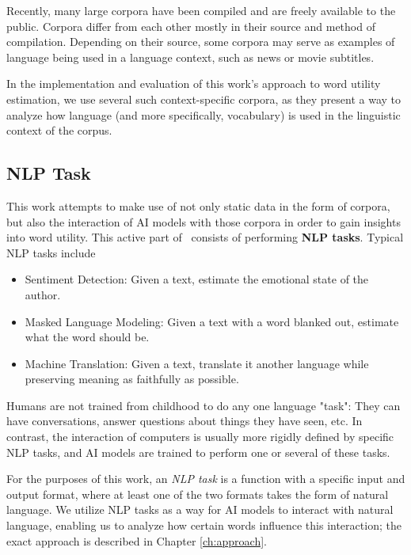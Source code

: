 Recently, many large corpora have been compiled and are freely available to the public.
Corpora differ from each other mostly in their source and method of compilation.
Depending on their source, some corpora may serve as examples of language being used in a language context, such as news or movie subtitles.

In the implementation and evaluation of this work's approach to word utility estimation, we use several such context-specific corpora, as they present a way to analyze how language (and more specifically, vocabulary) is used in the linguistic context of the corpus.

\subsection{NLP Task}
This work attempts to make use of not only static data in the form of corpora, but also the interaction of AI models with those corpora in order to gain insights into word utility.
This active part of \NLP\ consists of performing \textbf{NLP tasks}.
Typical NLP tasks include \cite{jurafskySpeechLanguageProcessing2025}

\begin{itemize}
	\item Sentiment Detection: Given a text, estimate the emotional state of the author.
	\item Masked Language Modeling: Given a text with a word blanked out, estimate what the word should be.
	\item Machine Translation: Given a text, translate it another language while preserving meaning as faithfully as possible.
\end{itemize}

Humans are not trained from childhood to do any one language "task":
They can have conversations, answer questions about things they have seen, etc.
In contrast, the interaction of computers is usually more rigidly defined by specific NLP tasks, and AI models are trained to perform one or several of these tasks.

For the purposes of this work, an \textit{NLP task} is a function with a specific input and output format, where at least one of the two formats takes the form of natural language.
We utilize NLP tasks as a way for AI models to interact with natural language, enabling us to analyze how certain words influence this interaction; the exact approach is described in Chapter \ref{ch:approach}.

